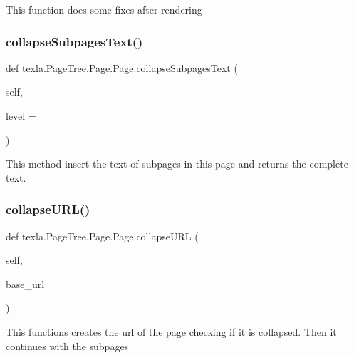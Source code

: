 \begin{DoxyVerb}This function does some fixes after rendering\end{DoxyVerb}
 \hypertarget{classtexla_1_1PageTree_1_1Page_1_1Page_a6d435028bd474b1b36abdbd4387fd08f}{}\label{classtexla_1_1PageTree_1_1Page_1_1Page_a6d435028bd474b1b36abdbd4387fd08f} 
\subsubsection{\texorpdfstring{collapse\+Subpages\+Text()}{collapseSubpagesText()}}
{\footnotesize\ttfamily def texla.\+Page\+Tree.\+Page.\+Page.\+collapse\+Subpages\+Text (\begin{DoxyParamCaption}\item[{}]{self,  }\item[{}]{level = {} }\end{DoxyParamCaption})}

\begin{DoxyVerb}This method insert the text of subpages in this
page and returns the complete text.\end{DoxyVerb}
 \hypertarget{classtexla_1_1PageTree_1_1Page_1_1Page_ab9d5fa24adb9159e80a0e5253f501622}{}\label{classtexla_1_1PageTree_1_1Page_1_1Page_ab9d5fa24adb9159e80a0e5253f501622} 
\subsubsection{\texorpdfstring{collapse\+U\+R\+L()}{collapseURL()}}
{\footnotesize\ttfamily def texla.\+Page\+Tree.\+Page.\+Page.\+collapse\+U\+RL (\begin{DoxyParamCaption}\item[{}]{self,  }\item[{}]{base\+\_\+url }\end{DoxyParamCaption})}

\begin{DoxyVerb}This functions creates the url of the page
checking if it is collapsed. Then it continues
with the subpages\end{DoxyVerb}
 \hypertarget{classtexla_1_1PageTree_1_1Page_1_1Page_a4c813de1c404e86c8e55c73e017ad4b2}{}\label{classtexla_1_1PageTree_1_1Page_1_1Page_a4c813de1c404e86c8e55c73e017ad4b2} 
